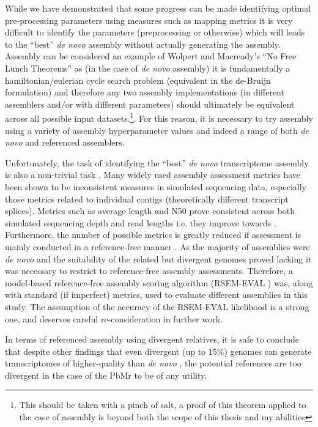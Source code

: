 While we have demonstrated that some progress can be made 
identifying optimal pre-processing parameters using measures such as mapping metrics 
it is very difficult to identify the parameters (preprocessing or otherwise) which will leads to the ``best'' 
\textit{de novo} assembly without actually generating the assembly.
  Assembly can be considered an example of Wolpert and Macready's ``No Free Lunch Theorems'' \citep{Wolpert1995,Wolpert1997} 
  as (in the case of \textit{de novo} assembly) it is fundamentally a hamiltonian/eulerian cycle search problem (equivalent
    in the de-Bruijn formulation) and therefore any two assembly implementations (in different assemblers and/or
    with different parameters) should ultimately be equivalent across all possible input datasets.\footnote{
    This should be taken with a pinch of salt, a proof of this theorem applied to the case of assembly is beyond
both the scope of this thesis and my abilities}.  For this reason, it is necessary to try
assembly using a variety of assembly hyperparameter values and indeed a range of both \textit{de novo} and referenced assemblers. 

Unfortunately, the task of identifying the ``best'' \textit{de novo} transcriptome assembly is also a non-trivial 
task \citep{Neil2013c}.  Many widely used assembly assessment metrics have been shown to be
inconsistent measures in simulated sequencing data, especially those metrics related to individual
contigs (theoretically different transcript splices).  Metrics such as average length and N50
prove consistent across both simulated sequencing depth and read lengths i.e. they improve 
towards \citep{Neil2013c}.  Furthermore, the number of possible metrics is greatly reduced
if assessment is mainly conducted in a reference-free manner \citep{Li2014}.  As the majority of
assemblies were \textit{de novo} and the suitability of the related but divergent genomes
proved lacking it was necessary to restrict to reference-free assembly assessments.  
Therefore, a model-based reference-free assembly scoring algorithm (RSEM-EVAL \citep{Li2014}) was,
 along with standard (if imperfect) metrics, used to evaluate different assemblies in this study.
 The assumption of the accuracy of the RSEM-EVAL likelihood is a strong one, and deserves careful re-consideration
 in further work.

In terms of referenced assembly using divergent relatives, 
it is safe to conclude that despite other findings that even divergent 
(up to 15\%) genomes can generate transcriptomes of higher-quality
than \textit{de novo} \citep{Vijay2013}, the potential references
are too divergent in the case of the PbMr to be of any utility.
    
